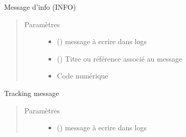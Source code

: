 \documentclass[letterpaper,10pt,french]{sphinxmanual}
\begin{document}
\begin{fulllineitems}
\begin{fulllineitems}
\begin{quote}
\begin{description}
\end{description}\end{quote}

\end{fulllineitems}


\begin{fulllineitems}
\label{\detokenize{classes/cfgloader:toolbox.logmng.CTracker.info_tracking}}
Message d’info (INFO)
\begin{quote}\begin{description}
\item[{Paramètres}] \leavevmode\begin{itemize}
\item {} 
 () \textendash{} message à ecrire dans logs

\item {} 
 () \textendash{} Titre ou référence associé au message

\item {} 
 \textendash{} Code numérique

\end{itemize}

\end{description}\end{quote}

\end{fulllineitems}


\begin{fulllineitems}
\label{\detokenize{classes/cfgloader:toolbox.logmng.CTracker.msg_tracking}}
Tracking message
\begin{quote}\begin{description}
\item[{Paramètres}] \leavevmode\begin{itemize}
\item {} 
 () \textendash{} message à ecrire dans logs


\end{itemize}
\end{description}
\end{quote}
\end{fulllineitems}
\end{fulllineitems}
\end{document}
